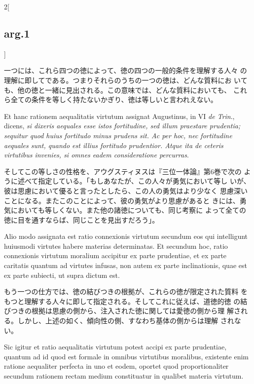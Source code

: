 \documentclass[paper=a4paper,fontsize=10pt,jafontsize=9pt,titlepage]{jlreq}
\begin{document}
\begin{paracol}{2}[\subsection{arg.1}]
\switchcolumn

一つには、これら四つの徳によって、徳の四つの一般的条件を理解する人々
 の理解に即してである。つまりそれらのうちの一つの徳は、どんな質料にお
 いても、他の徳と一緒に見出される。この意味では、どんな質料においても、
 これら全ての条件を等しく持たないかぎり、徳は等しいと言われえない。

\switchcolumn*

Et hanc rationem aequalitatis virtutum assignat Augustinus, in VI
 {\itshape de Trin}., dicens, {\itshape si dixeris aequales esse istos
 fortitudine, sed illum praestare prudentia; sequitur quod huius
 fortitudo minus prudens sit. Ac per hoc, nec fortitudine aequales
 sunt, quando est illius fortitudo prudentior. Atque ita de ceteris
 virtutibus invenies, si omnes eadem consideratione percurras}.

\switchcolumn

そしてこの等しさの性格を、アウグスティヌスは『三位一体論』第6巻で次の
 ように述べて指定している。「もしあなたが、この人々が勇気において等し
 いが、彼は思慮において優ると言ったとしたら、この人の勇気はより少なく
 思慮深いことになる。またこのことによって、彼の勇気がより思慮があると
 きには、勇気においても等しくない。また他の諸徳についても、同じ考察に
 よって全ての徳に目を通すならば、同じことを見出すだろう」。

\switchcolumn*

Alio modo assignata est ratio connexionis virtutum secundum eos qui
 intelligunt huiusmodi virtutes habere materias determinatas. Et
 secundum hoc, ratio connexionis virtutum moralium accipitur ex parte
 prudentiae, et ex parte caritatis quantum ad virtutes infusas, non
 autem ex parte inclinationis, quae est ex parte subiecti, ut supra
 dictum est.

\switchcolumn

もう一つの仕方では、徳の結びつきの根拠が、これらの徳が限定された質料
 をもつと理解する人々に即して指定される。そしてこれに従えば、道徳的徳
 の結びつきの根拠は思慮の側から、注入された徳に関しては愛徳の側から理
 解される。しかし、上述の如く、傾向性の側、すなわち基体の側からは理解
 されない。

\switchcolumn*

Sic igitur et ratio aequalitatis virtutum potest accipi
 ex parte prudentiae, quantum ad id quod est formale in omnibus
 virtutibus moralibus, existente enim ratione aequaliter perfecta in
 uno et eodem, oportet quod proportionaliter secundum rationem rectam
 medium constituatur in qualibet materia virtutum.


\end{paracol}
\end{document}
